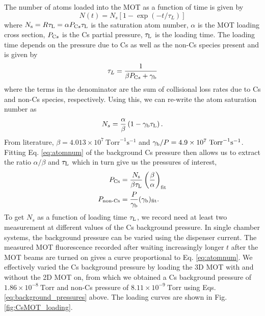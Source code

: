 The number of atoms loaded into the MOT as a function of time is given by
\begin{equation}\label{eq:atomnum}
N(t)=N_s\left[1-\exp \left(-t / \tau_L\right)\right]
\end{equation}
where $N_{\text s}=R \tau_{\text L}=\alpha P_{\text Cs} \tau_{\text L}$ is the saturation atom number, $\alpha$ is the MOT loading cross section, $P_{\text Cs}$ is the Cs partial pressure, $\tau_{\text L}$ is the loading time. The loading time depends on the pressure due to Cs as well as the non-Cs species present and is given by
\begin{equation}
\tau_L=\frac{1}{\beta P_{\text Cs}+\gamma_{\text b}}
\end{equation}
where the terms in the denominator are the sum of collisional loss rates due to Cs and non-Cs species, respectively\cite{RRCAT2020}. Using this, we can re-write the atom saturation number as 
\begin{equation}
N_s=\frac{\alpha}{\beta}\left(1-\gamma_{\text b} \tau_{\text L}\right).
\end{equation}
From literature, $\beta=4.013\times10^7 ~\text{Torr}^{-1} \text{s}^{-1}$ and $\gamma_{\text b}/P=4.9\times10^7 ~\text{Torr}^{-1} \text{s}^{-1}$\cite{Arnthorp2012}. Fitting Eq. \ref{eq:atomnum} of the background Cs pressure then allows us to extract the ratio $\alpha/\beta$ and $\tau_{\text L}$ which in turn give us the pressures of interest, 
\begin{equation}\label{eq:background_pressures}
\begin{aligned}
    P_{\text {Cs}} &= \frac{N_{\text s}}{\beta \tau_{\text L}}\left(\frac{\beta}{\alpha}\right)_{\text {fit}}\\
    P_{\text {non-Cs}} &= \frac{P}{\gamma_{\text b}}(\gamma_{\text b})_{\text{fit}}.
\end{aligned}
\end{equation}
To get $N_s$ as a function of loading time $\tau_{\text L}$, we record need at least two measurement at different values of the Cs background pressure. In single chamber systems, the background pressure can be varied using the dispenser current. The measured MOT fluorescence recorded after waiting increasingly longer $t$ after the MOT beams are turned on gives a curve proportional to Eq. \ref{eq:atomnum}. We effectively varied the Cs background pressure by loading the 3D MOT with and without the 2D MOT on, from which we obtained a Cs background pressure of $1.86\times10^{-8} ~\text{Torr}$ and non-Cs pressure of $8.11\times10^{-9} ~\text{Torr}$ using Eqs.  \ref{eq:background_pressures} above. The loading curves are shown in Fig. \ref{fig:CsMOT_loading}.

